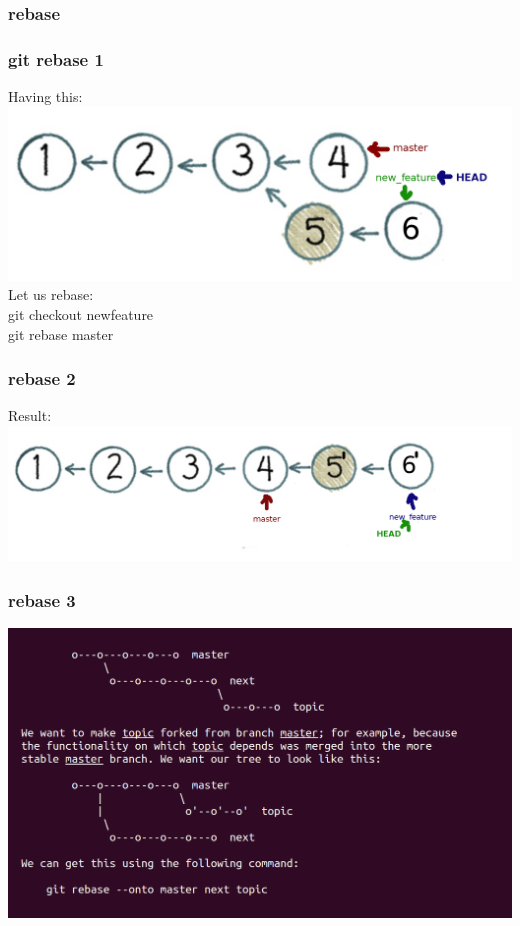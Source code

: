 \documentclass{beamer}
\begin{document}
		\subsubsection{rebase}
		\begin{frame}
			\frametitle{git rebase 1}
        Having this: \\
				\includegraphics[scale=0.25]{images/rebase1} \\
        Let us rebase: \\
        git checkout new\textunderscore feature \\
        git rebase master
		\end{frame}

		\begin{frame}
			\frametitle{rebase 2}
      Result: \\
				\includegraphics[scale=0.25]{images/rebase2}
		\end{frame}

		\begin{frame}
			\frametitle{rebase 3}
				\includegraphics[scale=0.25]{images/rebase-into}
		\end{frame}
\end{document}
